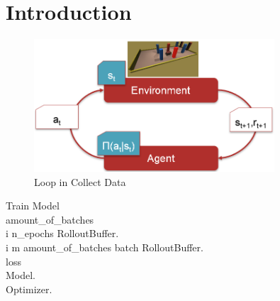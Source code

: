 \chapter{Introduction}
\label{cha:Introduction}
\lipsum \autocite{DBLP:books/sp/HarderR01}

\begin{figure}
    \centering
    \includegraphics[width=0.8\textwidth]{Bilder/rl_cycle.png}
    \caption{Loop in Collect Data}
    \label{fig:unitycommunication}
\end{figure}


\renewcommand{\thepseudonum}{\roman{pseudonum}}
\begin{pseudocode}{Train Model}{ }
\\

amount\_of\_batches \GETS {}\\
\FOR i  \TO n\_epochs \DO
\BEGIN
RolloutBuffer.\\
\FOR i \GETS m \TO amount\_of\_batches \DO
\BEGIN
batch \GETS RolloutBuffer.\\
loss \GETS {}\\
Model.\\
Optimizer.\\
\END\\
\END
\ENDPROCEDURE

\end{pseudocode}
